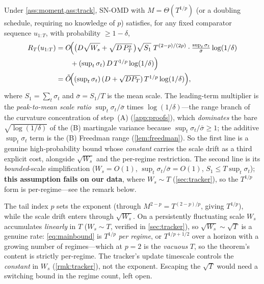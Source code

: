 \documentclass{article}
\begin{document}
\begin{theorem}
\label{thm:regret}
Under \cref{ass:moment,ass:track}, SN-OMD with $M=\Theta(T^{1/p})$ (or a
doubling schedule, requiring no knowledge of $p$) satisfies, for any fixed comparator
sequence $u_{1:T}$, with probability $\ge1-\delta$,
\begin{align}
\label{eq:mainbound}
R_T(u_{1:T})
&= O\!\Bigl(\bigl(D\sqrt{W_s}+\sqrt{D\,P_T^s}\,\bigr)\sqrt{S_1}\;T^{(2-p)/(2p)}
   \cdot\tfrac{\sup_t\sigma_t}{\bar\sigma}\log(1/\delta)\\
&\qquad{}+(\textstyle\sup_t\sigma_t)\,D\,T^{1/p}\log(1/\delta)\Bigr)\nonumber\\
&= \tilde O\!\Bigl((\textstyle\sup_t\sigma_t)\,(D+\sqrt{D P_T})\,T^{1/p}
   \log(1/\delta)\Bigr),\nonumber
\end{align}
where $S_1=\sum_t\sigma_t$ and $\bar\sigma=S_1/T$ is the mean scale. The leading-term
multiplier is the \emph{peak-to-mean scale ratio} $\sup_t\sigma_t/\bar\sigma$ times
$\log(1/\delta)$---the range branch of the curvature concentration of step~(A)
(\cref{app:proofs}), which \emph{dominates} the bare $\sqrt{\log(1/\delta)}$ of the (B)
martingale variance because $\sup_t\sigma_t/\bar\sigma\ge1$; the additive $\sup_t\sigma_t$ term
is the (B) Freedman range (\cref{lem:freedman}). So the first line is a genuine
high-probability bound whose \emph{constant} carries the scale drift as a third explicit cost,
alongside $\sqrt{W_s}$ and the per-regime restriction. The second line is its
\emph{bounded}-scale simplification ($W_s=O(1)$, $\sup_t\sigma_t/\bar\sigma=O(1)$,
$S_1\le T\sup_t\sigma_t$); \textbf{this assumption fails on our data}, where $W_s\sim T$
(\cref{sec:tracker}), so the $T^{1/p}$ form is per-regime---see the remark below.
\end{theorem}

\begin{remark}
The tail index $p$ sets the exponent (through $M^{2-p}=T^{(2-p)/p}$, giving $T^{1/p}$),
while the scale drift enters through $\sqrt{W_s}$. On a persistently fluctuating scale
$W_s$ accumulates \emph{linearly} in $T$ ($W_s\sim T$, verified in \cref{sec:tracker}), so
$\sqrt{W_s}\sim\sqrt T$ is a genuine rate: \eqref{eq:mainbound} is $T^{1/p}$ \emph{per
regime}, or $T^{1/p+1/2}$ over a horizon with a growing number of regimes---which at
$p=2$ is the \emph{vacuous} $T$, so the theorem's content is strictly per-regime. The tracker's
update timescale controls the \emph{constant} in $W_s$ (\cref{rmk:tracker}), not the
exponent. Escaping the $\sqrt T$ would need a switching bound in the regime count, left
open.
\end{remark}
\end{document}
